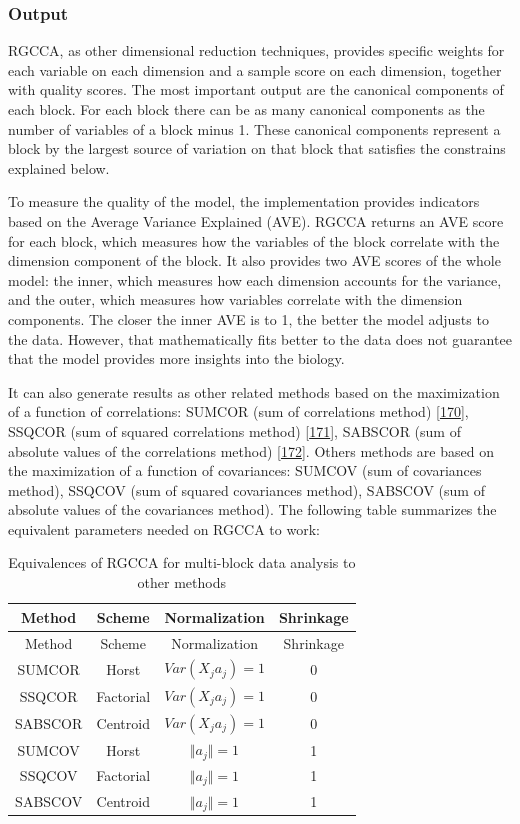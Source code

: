 \documentclass[
  12pt,
  a4paper,
  twoside,
  openright]{book}
\begin{document}
\hypertarget{rgcca-output}{%
\subsubsection{Output}\label{rgcca-output}}

RGCCA, as other dimensional reduction techniques, provides specific weights for each variable on each dimension and a sample score on each dimension, together with quality scores.
The most important output are the canonical components of each block.
For each block there can be as many canonical components as the number of variables of a block minus 1.
These canonical components represent a block by the largest source of variation on that block that satisfies the constrains explained below.

To measure the quality of the model, the implementation provides indicators based on the Average Variance Explained (AVE).
RGCCA returns an AVE score for each block, which measures how the variables of the block correlate with the dimension component of the block.
It also provides two AVE scores of the whole model: the inner, which measures how each dimension accounts for the variance, and the outer, which measures how variables correlate with the dimension components.
The closer the inner AVE is to 1, the better the model adjusts to the data.
However, that mathematically fits better to the data does not guarantee that the model provides more insights into the biology.

It can also generate results as other related methods based on the maximization of a function of correlations: SUMCOR (sum of correlations method) {[}\protect\hyperlink{ref-horst1961}{170}{]}, SSQCOR (sum of squared correlations method) {[}\protect\hyperlink{ref-kettenring1971}{171}{]}, SABSCOR (sum of absolute values of the correlations method) {[}\protect\hyperlink{ref-vandegeer1984}{172}{]}.
Others methods are based on the maximization of a function of covariances: SUMCOV (sum of covariances method), SSQCOV (sum of squared covariances method), SABSCOV (sum of absolute values of the covariances method).
The following table summarizes the equivalent parameters needed on RGCCA to work:

\begin{longtable}[]{@{}cccc@{}}
\caption{\label{tab:RGCCA-methods} Equivalences of RGCCA for multi-block data analysis to other methods}\tabularnewline
\toprule
Method & Scheme & Normalization & Shrinkage \\
\midrule
\endfirsthead
\toprule
Method & Scheme & Normalization & Shrinkage \\
\midrule
\endhead
SUMCOR & Horst & \(Var(X_j a_j) = 1\) & 0 \\
SSQCOR & Factorial & \(Var(X_j a_j) = 1\) & 0 \\
SABSCOR & Centroid & \(Var(X_j a_j) = 1\) & 0 \\
SUMCOV & Horst & \(\Vert a_j \Vert = 1\) & 1 \\
SSQCOV & Factorial & \(\Vert a_j \Vert = 1\) & 1 \\
SABSCOV & Centroid & \(\Vert a_j \Vert = 1\) & 1 \\
\bottomrule
\end{longtable}
\end{document}
